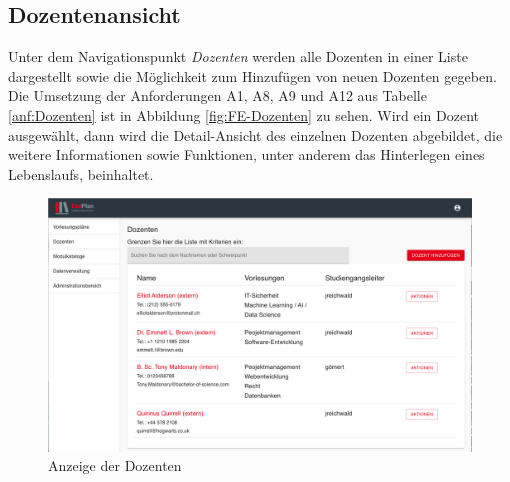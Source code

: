 \subsection{Dozentenansicht}
Unter dem Navigationspunkt \textit{Dozenten} werden alle Dozenten in einer Liste dargestellt sowie die Möglichkeit zum Hinzufügen von neuen Dozenten gegeben.
Die Umsetzung der Anforderungen A1, A8, A9 und A12 aus Tabelle \vref{anf:Dozenten} ist in Abbildung \vref{fig:FE-Dozenten} zu sehen.
Wird ein Dozent ausgewählt, dann wird die Detail-Ansicht des einzelnen Dozenten abgebildet, die weitere Informationen sowie Funktionen, unter anderem das Hinterlegen eines Lebenslaufs, beinhaltet.
\begin{figure}[H]
	\centering 
	\includegraphics[width=\textwidth]{img/FrontEnd/Dozenten.png}
	\caption[Anzeige der Dozenten]{\label{fig:FE-Dozenten}Anzeige der Dozenten}
\end{figure}

